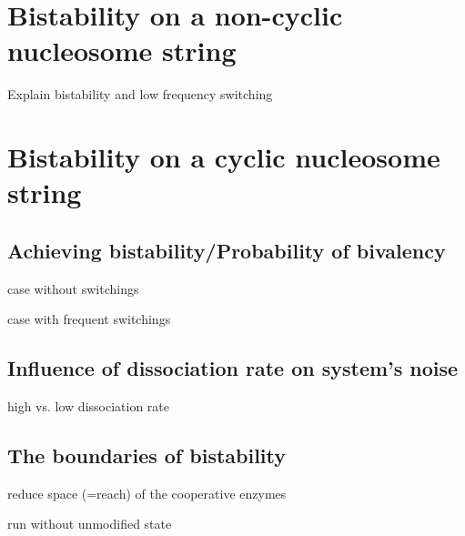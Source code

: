     \section{Bistability on a non-cyclic nucleosome string}
        \begin{itemize}
            {
                \color{red}
                \item Explain bistability and low frequency switching
            }
        \end{itemize}
    \section{Bistability on a cyclic nucleosome string}
        \subsection{Achieving bistability/Probability of bivalency}
            \begin{itemize}
                {
                    \color{red}
                    \item case without switchings
                    \item case with frequent switchings
                }
            \end{itemize}
        \subsection{Influence of dissociation rate on system's noise}
            \begin{itemize}
                {
                    \color{red}
                    \item high vs. low dissociation rate
                }
            \end{itemize}
        \subsection{The boundaries of bistability}
            \begin{itemize}
                {
                    \color{red}
                    \item reduce space (=reach) of the cooperative enzymes
                    \item run without unmodified state
                }
            \end{itemize}
